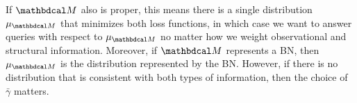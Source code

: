 \documentclass{article}
\newcommand\zogamma{{\bar\gamma}}
\begin{document}
%
\def\PrM{\mu_{\dg M}}%
If $\dg M$ also is proper,
    this means there is
    a single distribution $\PrM$
    that minimizes both loss functions, 
    in which case we want to answer queries with respect to $\PrM$
    no matter how we weight observational and structural information. 
Moreover, if $\dg M$ represents a BN,
then $\PrM$ is the distribution represented by the BN.  
However, if there is no distribution that is consistent with both types of information, then the choice of $\zogamma$ matters.  

\end{document}
